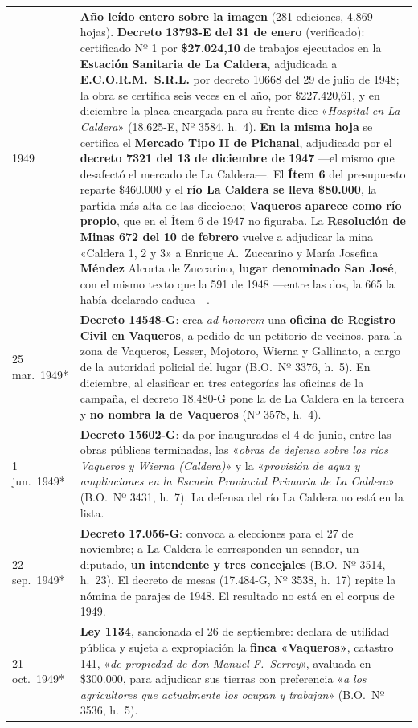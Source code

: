 \begin{longtable}{@{}p{2.7cm}p{10.3cm}@{}}
1949 & \textbf{Año leído entero sobre la imagen} (281 ediciones, 4.869 hojas). \textbf{Decreto 13793-E del 31 de enero} (verificado): certificado Nº 1 por \textbf{\$27.024,10} de trabajos ejecutados en la \textbf{Estación Sanitaria de La Caldera}, adjudicada a \textbf{E.C.O.R.M.\ S.R.L.} por decreto 10668 del 29 de julio de 1948; la obra se certifica seis veces en el año, por \$227.420,61, y en diciembre la placa encargada para su frente dice «\textit{Hospital en La Caldera}» (18.625-E, Nº 3584, h.\ 4). \textbf{En la misma hoja} se certifica el \textbf{Mercado Tipo II de Pichanal}, adjudicado por el \textbf{decreto 7321 del 13 de diciembre de 1947} ---el mismo que desafectó el mercado de La Caldera---. El \textbf{Ítem 6} del presupuesto reparte \$460.000 y el \textbf{río La Caldera se lleva \$80.000}, la partida más alta de las dieciocho; \textbf{Vaqueros aparece como río propio}, que en el Ítem 6 de 1947 no figuraba. La \textbf{Resolución de Minas 672 del 10 de febrero} vuelve a adjudicar la mina «Caldera 1, 2 y 3» a Enrique A.\ Zuccarino y María Josefina \textbf{Méndez} Alcorta de Zuccarino, \textbf{lugar denominado San José}, con el mismo texto que la 591 de 1948 ---entre las dos, la 665 la había declarado caduca---. \\
25 mar.\ 1949* & \textbf{Decreto 14548-G}: crea \textit{ad honorem} una \textbf{oficina de Registro Civil en Vaqueros}, a pedido de un petitorio de vecinos, para la zona de Vaqueros, Lesser, Mojotoro, Wierna y Gallinato, a cargo de la autoridad policial del lugar (B.O.\ Nº 3376, h.\ 5). En diciembre, al clasificar en tres categorías las oficinas de la campaña, el decreto 18.480-G pone la de La Caldera en la tercera y \textbf{no nombra la de Vaqueros} (Nº 3578, h.\ 4). \\
1 jun.\ 1949* & \textbf{Decreto 15602-G}: da por inauguradas el 4 de junio, entre las obras públicas terminadas, las «\textit{obras de defensa sobre los ríos Vaqueros y Wierna (Caldera)}» y la «\textit{provisión de agua y ampliaciones en la Escuela Provincial Primaria de La Caldera}» (B.O.\ Nº 3431, h.\ 7). La defensa del río La Caldera no está en la lista. \\
22 sep.\ 1949* & \textbf{Decreto 17.056-G}: convoca a elecciones para el 27 de noviembre; a La Caldera le corresponden un senador, un diputado, \textbf{un intendente y tres concejales} (B.O.\ Nº 3514, h.\ 23). El decreto de mesas (17.484-G, Nº 3538, h.\ 17) repite la nómina de parajes de 1948. El resultado no está en el corpus de 1949. \\
21 oct.\ 1949* & \textbf{Ley 1134}, sancionada el 26 de septiembre: declara de utilidad pública y sujeta a expropiación la \textbf{finca «Vaqueros»}, catastro 141, «\textit{de propiedad de don Manuel F.\ Serrey}», avaluada en \$300.000, para adjudicar sus tierras con preferencia «\textit{a los agricultores que actualmente los ocupan y trabajan}» (B.O.\ Nº 3536, h.\ 5). \\

\end{longtable}
